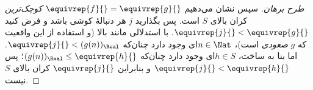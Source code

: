 \documentclass[../../../include/open-logic-section]{subfiles}
\begin{document}
\begin{proof}[طرح برهان]
سپس نشان می‌دهیم $\equivrep{f}{} = \equivrep{g}{}$ \emph{کوچک‌ترین}
کران بالای $S$ است. پس بگذارید $j$ هر دنبالهٔ کوشی باشد و فرض کنید
$\equivrep{j}{} < \equivrep{g}{}$. با استدلالی مانند بالا (و استفاده از
این واقعیت که $g$ \emph{صعودی} است)، $n \in \Nat$ای وجود دارد چنان‌که
$\equivrep{j}{} < (g(n))_\Real$. اما بنا به ساخت، $h \in S$ای وجود دارد
چنان‌که $(g(n))_\Real \leq \equivrep{h}{}$؛ پس $\equivrep{j}{} <
\equivrep{h}{}$ و بنابراین $\equivrep{j}{}$ کران بالای $S$ نیست.
\end{proof}
\end{document}
